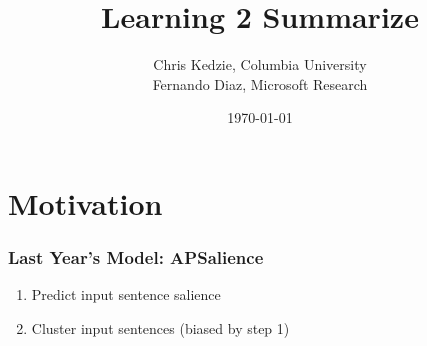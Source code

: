 \documentclass{beamer}
\title[L2Sum]{Learning 2 Summarize}
\author[Chris Kedzie]{Chris Kedzie, Columbia University\\
Fernando Diaz, Microsoft Research\\}
\institute[Columbia U.] %
{
\medskip
\textit{kedzie@cs.columbia.edu} %
}
\date{\today} %
\begin{document}
\begin{frame}
\titlepage %
\end{frame}



\section{Motivation}
%





\begin{frame}
\frametitle{Last Year's Model: APSalience}

\begin{enumerate}
    \item Predict input sentence salience 
    \item Cluster input sentences (biased by step 1)
\end{enumerate}

\end{frame}
\end{document}
